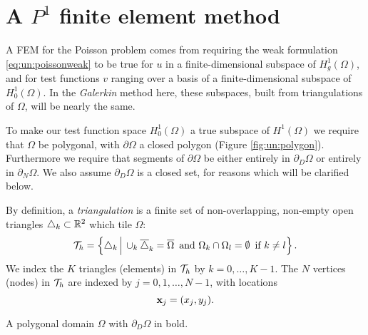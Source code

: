\section{A $P^1$ finite element method}


A FEM for the Poisson problem comes from requiring the weak formulation \eqref{eq:un:poissonweak} to be true for $u$ in a finite-dimensional subspace of $H_{g}^1(\Omega)$, and for test functions $v$ ranging over a basis of a finite-dimensional subspace of $H_{0}^1(\Omega)$.  In the \emph{Galerkin} method here, these subspaces, built from triangulations of $\Omega$, will be nearly the same.

To make our test function space $H_{0}^1(\Omega)$ a true subspace of $H^1(\Omega)$ we require that $\Omega$ be polygonal, with $\partial\Omega$ a closed polygon (Figure \ref{fig:un:polygon}).  Furthermore we require that segments of $\partial\Omega$ be either entirely in $\partial_D\Omega$ or entirely in $\partial_N\Omega$.  We also assume $\partial_D\Omega$ is a closed set, for reasons which will be clarified below.

By definition, a \emph{triangulation} is a finite set of non-overlapping, non-empty open triangles $\triangle_k\subset \mathbb{R}^2$ which tile $\Omega$:
\begin{equation}
\mathcal{T}_h = \left\{\triangle_k \,\Big|\, \cup_k \overline{\triangle}_k = \overline{\Omega} \, \text{ and} \,\, \Omega_k \cap \Omega_l = \emptyset \, \text{ if } k\ne l\right\}. \label{eq:un:triangulation}
\end{equation}
We index the $K$ triangles (elements) in $\mathcal{T}_h$ by $k=0,\dots,K-1$.  The $N$ vertices (nodes) in $\mathcal{T}_h$ are indexed by $j=0,1,\dots,N-1$, with locations
\begin{equation*}
\mathbf{x}_j = (x_j,y_j).
\end{equation*}

\begin{marginfigure}

\caption{A polygonal domain $\Omega$ with $\partial_D\Omega$ in bold.}
\label{fig:un:polygon}
\end{marginfigure}

